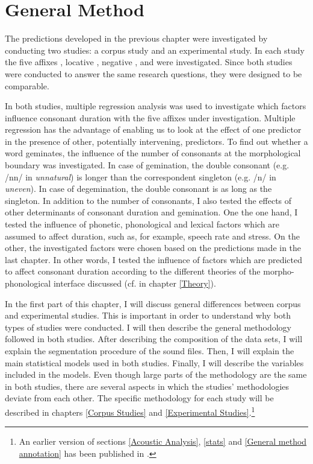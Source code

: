 \chapter{General Method} \label{General Method}

\vspace*{-0.3cm}

The predictions developed in the previous chapter were investigated by conducting two studies: a corpus study and an experimental study. In each study the five affixes , locative , negative ,  and  were investigated. 
Since both studies were conducted to answer the same research questions, they were designed to be comparable.  

In both studies, multiple regression analysis was used to investigate which factors influence consonant duration with the five affixes under investigation. Multiple regression has the advantage of enabling us to look at the effect of one predictor in the presence of other, potentially intervening, predictors.  
To find out whether a word geminates, the influence of the number of consonants at the morphological boundary was investigated. In case of gemination, the double consonant (e.g. /nn/ in \textit{unnatural}) is longer than the correspondent singleton (e.g. /n/ in \textit{uneven}). In case of degemination, the double consonant is as long as the singleton. In addition to the number of consonants, I also tested the effects of other determinants of consonant duration and gemination. One the one hand, I tested the influence of phonetic, phonological and lexical factors which are assumed to affect duration, such as, for example, speech rate and stress. On the other, the investigated factors were chosen based on the predictions made in the last chapter. In other words, I tested the influence of factors which are predicted to affect consonant duration according to the different theories of the morpho-phonological interface discussed (cf.  in chapter \ref{Theory}). 




In the first part of this chapter, I will discuss general differences between corpus and experimental studies. This is important in order to understand why both types of studies were conducted. I will then describe the general methodology followed in both studies. After describing the composition of the data sets, I will explain the segmentation procedure of the sound files. Then, I will explain the main statistical models used in both studies. Finally, I will describe the variables included in the models.
Even though large parts of the methodology are the same in both studies, there are several aspects in which the studies' methodologies deviate from each other. The specific methodology for each study will be described in chapters \ref{Corpus Studies} and \ref{Experimental Studies}.\footnote{An earlier version of sections \ref{Acoustic Analysis}, \ref{stats}  and \ref{General method annotation} has been published in \cite{BenHedia.2017}.}


